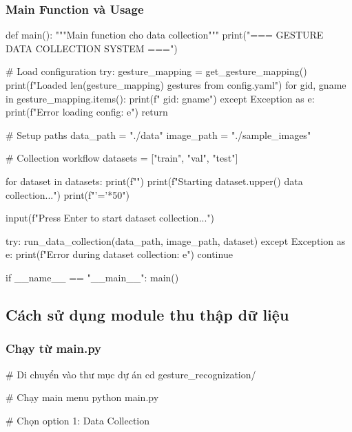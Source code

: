 \subsubsection{Main Function và Usage}

\begin{aivncodebox}
\begin{python}
def main():
    """Main function cho data collection"""
    print("=== GESTURE DATA COLLECTION SYSTEM ===")
    
    # Load configuration
    try:
        gesture_mapping = get_gesture_mapping()
        print(f"Loaded {len(gesture_mapping)} gestures from config.yaml")
        for gid, gname in gesture_mapping.items():
            print(f"  {gid}: {gname}")
    except Exception as e:
        print(f"Error loading config: {e}")
        return
    
    # Setup paths
    data_path = "./data"
    image_path = "./sample_images"
    
    # Collection workflow
    datasets = ["train", "val", "test"]
    
    for dataset in datasets:
        print(f"")
        print(f"Starting {dataset.upper()} data collection...")
        print(f"{'='*50}")
        
        input(f"Press Enter to start {dataset} collection...")
        
        try:
            run_data_collection(data_path, image_path, dataset)
        except Exception as e:
            print(f"Error during {dataset} collection: {e}")
            continue
   
if __name__ == "__main__":
    main()
\end{python}
\end{aivncodebox}

\subsection{Cách sử dụng module thu thập dữ liệu}

\subsubsection{Chạy từ main.py}

\begin{aivncodebox}
\begin{python}
# Di chuyển vào thư mục dự án
cd gesture_recognization/

# Chạy main menu
python main.py

# Chọn option 1: Data Collection
\end{python}
\end{aivncodebox}

